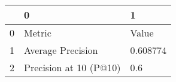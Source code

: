 \begin{tabular}{lll}
\toprule
{} &                       0 &         1 \\
\midrule
0 &                  Metric &     Value \\
1 &       Average Precision &  0.608774 \\
2 &  Precision at 10 (P@10) &       0.6 \\
\bottomrule
\end{tabular}
